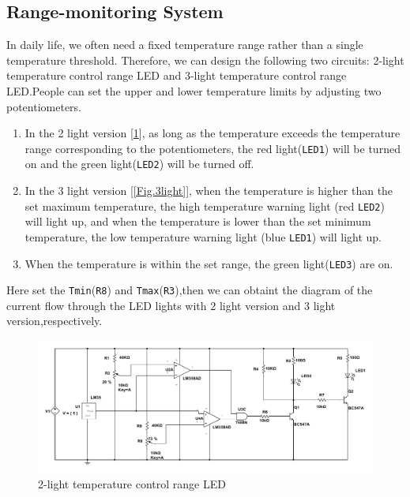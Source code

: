 \documentclass[12pt]{article}
\numberwithin{equation}{section}
\begin{document}
\subsection{Range-monitoring System}
In daily life, we often need a fixed temperature range rather than a single temperature threshold. Therefore, we can design the following two circuits: 2-light temperature control range LED and 3-light temperature control range LED.People can set the upper and lower temperature limits by adjusting two potentiometers.
\begin{enumerate}
	\item In the 2 light version [\ref{Fig.2light}], as long as the temperature exceeds the temperature range corresponding to the potentiometers, the red light(\verb|LED1|) will be turned on and the green light(\verb|LED2|) will be turned off.
	\item In the 3 light version [\ref{Fig.3light}], when the temperature is higher than the set maximum temperature, the high temperature warning light (red \verb|LED2|) will light up, and when the temperature is lower than the set minimum temperature, the low temperature warning light (blue \verb|LED1|) will light up.
	\item When the temperature is within the set range, the green light(\verb|LED3|) are on.
\end{enumerate}

Here set the \verb|Tmin|(\verb|R8|) and \verb|Tmax|(\verb|R3|),then we can obtaint the diagram of the current flow through the LED lights with 2 light version and 3 light version,respectively.


\begin{figure}[H] %
\centering %
\includegraphics[width=\textwidth]{2light_range} %
\caption{2-light temperature control range LED} %
\label{Fig.2light} %
\end{figure}
\end{document}
